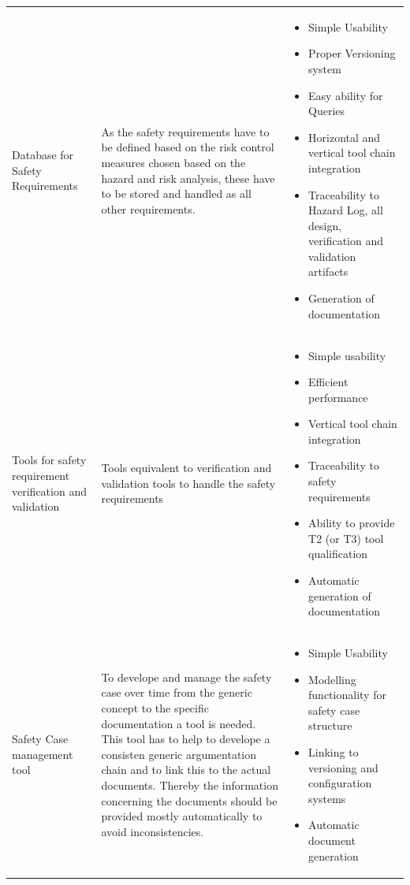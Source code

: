 \documentclass{template/openetcs_article}
\begin{document}
\begin{longtable}[htbp]{p{4cm}|p{5cm}|p{5cm}}
     Database for Safety Requirements & As the safety requirements have to be defined based on the risk control measures chosen based on the hazard and risk analysis, these have to be stored and handled as all other requirements. & \begin{itemize}
                   \item Simple Usability
                   \item Proper Versioning system 
                   \item Easy ability for Queries
                   \item Horizontal and vertical tool chain integration
                   \item Traceability to Hazard Log, all design, verification and validation artifacts
                   \item Generation of documentation
                       \end{itemize} \\  
     Tools for safety requirement verification and validation & Tools equivalent to verification and validation tools to handle the safety requirements & \begin{itemize}
                        \item Simple usability
                        \item Efficient performance
                        \item Vertical tool chain integration
                        \item Traceability to safety requirements
                        \item Ability to provide T2 (or T3) tool qualification 
                        \item Automatic generation of documentation
                            \end{itemize}\\
     Safety Case management tool & To develope and manage the safety case over time from the generic concept to the specific documentation a tool is needed. This tool has to help to develope a consisten generic argumentation chain and to link this to the actual documents. Thereby the information concerning the documents should be provided mostly automatically to avoid inconsistencies. & \begin{itemize}
                   \item Simple Usability
                   \item Modelling  functionality for safety case structure
                   \item Linking to versioning and configuration systems
                   \item Automatic document generation
                       \end{itemize}   \\ 
    \end{longtable}%
 
\end{document}
